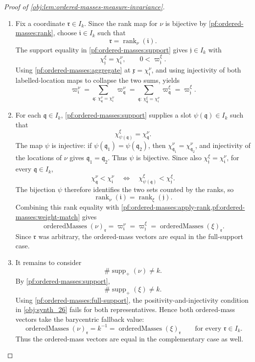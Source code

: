 \begin{proof}[Proof of \cref{obj:lem:ordered-masses-measure-invariance}]
\begin{enumerate}
\item\label{pf:ordered-masses:weight-match}
Fix a coordinate \(\mathfrak r\in I_k\).  Since the rank map for \(\nu\) is bijective by \cref{pf:ordered-masses:rank}, choose \(\mathfrak i\in I_k\) such that
\[
\mathfrak r=\operatorname{rank}_{\nu}(\mathfrak i).
\]
The support equality in \cref{pf:ordered-masses:support} gives \(\mathfrak j\in I_k\) with
\[
\chi^\xi_{\mathfrak j}=\chi^\nu_{\mathfrak i},
\qquad
0<\varpi^\xi_{\mathfrak j}.
\]
Using \cref{pf:ordered-masses:aggregate} at \(\mathfrak x=\chi^\nu_{\mathfrak i}\), and using injectivity of both labelled-location maps to collapse the two sums, yields
\[
\varpi^\nu_{\mathfrak i}
=
\sum_{\mathfrak q:\,\chi^\nu_{\mathfrak q}=\chi^\nu_{\mathfrak i}}
\varpi^\nu_{\mathfrak q}
=
\sum_{\mathfrak q:\,\chi^\xi_{\mathfrak q}=\chi^\nu_{\mathfrak i}}
\varpi^\xi_{\mathfrak q}
=
\varpi^\xi_{\mathfrak j}.
\]

\item\label{pf:ordered-masses:rank-match}
For each \(\mathfrak q\in I_k\), \cref{pf:ordered-masses:support} supplies a slot
\(\psi(\mathfrak q)\in I_k\) such that
\[
\chi^\xi_{\psi(\mathfrak q)}=\chi^\nu_{\mathfrak q}.
\]
The map \(\psi\) is injective: if \(\psi(\mathfrak q_1)=\psi(\mathfrak q_2)\), then
\(\chi^\nu_{\mathfrak q_1}=\chi^\nu_{\mathfrak q_2}\), and injectivity of the locations of \(\nu\) gives
\(\mathfrak q_1=\mathfrak q_2\).  Thus \(\psi\) is bijective.  Since also
\(\chi^\xi_{\mathfrak j}=\chi^\nu_{\mathfrak i}\), for every \(\mathfrak q\in I_k\),
\[
\chi^\nu_{\mathfrak q}<\chi^\nu_{\mathfrak i}
\quad\Longleftrightarrow\quad
\chi^\xi_{\psi(\mathfrak q)}<\chi^\xi_{\mathfrak j}.
\]
The bijection \(\psi\) therefore identifies the two sets counted by the ranks, so
\[
\operatorname{rank}_{\nu}(\mathfrak i)
=
\operatorname{rank}_{\xi}(\mathfrak j).
\]
Combining this rank equality with \cref{pf:ordered-masses:apply-rank,pf:ordered-masses:weight-match} gives
\[
\operatorname{orderedMasses}(\nu)_{\mathfrak r}
=
\varpi^\nu_{\mathfrak i}
=
\varpi^\xi_{\mathfrak j}
=
\operatorname{orderedMasses}(\xi)_{\mathfrak r}.
\]
Since \(\mathfrak r\) was arbitrary, the ordered-mass vectors are equal in the full-support case.

\item\label{pf:ordered-masses:fallback}
It remains to consider
\[
\#\operatorname{supp}_+(\nu)\ne k .
\]
By \cref{pf:ordered-masses:support},
\[
\#\operatorname{supp}_+(\xi)\ne k .
\]
Using \cref{pf:ordered-masses:full-support}, the positivity-and-injectivity condition in \cref{obj:synth_26} fails for both representatives.  Hence both ordered-mass vectors take the barycentric fallback value:
\[
\operatorname{orderedMasses}(\nu)_{\mathfrak r}
=
k^{-1}
=
\operatorname{orderedMasses}(\xi)_{\mathfrak r}
\qquad\text{for every }\mathfrak r\in I_k .
\]
Thus the ordered-mass vectors are equal in the complementary case as well.
\end{enumerate}


\end{proof}
